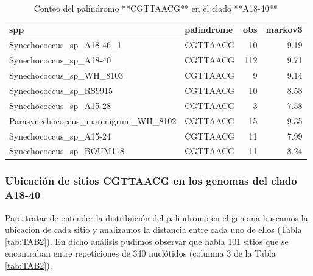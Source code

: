 \documentclass[
]{book}
\begin{document}
\begin{table}

\caption{\label{tab:TAB1}Conteo del palíndromo **CGTTAACG** en el clado **A18-40**}
\centering
\begin{tabular}[t]{llrr}
\toprule
spp & palindrome & obs & markov3\\
\midrule
Synechococcus\_sp\_A18-46\_1 & CGTTAACG & 10 & 9.19\\
Synechococcus\_sp\_A18-40 & CGTTAACG & 112 & 9.71\\
Synechococcus\_sp\_WH\_8103 & CGTTAACG & 9 & 9.14\\
Synechococcus\_sp\_RS9915 & CGTTAACG & 10 & 8.58\\
Synechococcus\_sp\_A15-28 & CGTTAACG & 3 & 7.58\\
\addlinespace
Parasynechococcus\_marenigrum\_WH\_8102 & CGTTAACG & 15 & 9.35\\
Synechococcus\_sp\_A15-24 & CGTTAACG & 11 & 7.99\\
Synechococcus\_sp\_BOUM118 & CGTTAACG & 11 & 8.24\\
\bottomrule
\end{tabular}
\end{table}

\hypertarget{ubicaciuxf3n-de-sitios-cgttaacg-en-los-genomas-del-clado-a18-40}{%
\subsubsection{Ubicación de sitios CGTTAACG en los genomas del clado A18-40}\label{ubicaciuxf3n-de-sitios-cgttaacg-en-los-genomas-del-clado-a18-40}}

Para tratar de entender la distribución del palindromo en el genoma buscamos la ubicación de cada sitio y analizamos la distancia entre cada uno de ellos (Tabla \ref{tab:TAB2}).
En dicho análisis pudimos observar que había 101 sitios que se encontraban entre repeticiones de 340 nuclótidos (columna 3 de la Tabla \ref{tab:TAB2}).
\end{document}
